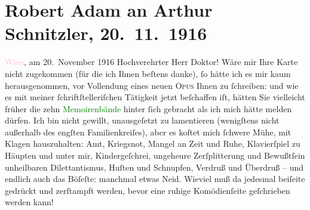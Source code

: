 

               \section[Robert Adam an Arthur Schnitzler, 20. 11. 1916]{ Robert Adam an Arthur Schnitzler, 20. 11. 1916}\nopagebreak{}\rehead{ }\normalsize\beginnumbering{} \toendnotes[C]{\smallbreak\pagebreak[2]} 
\toendnotes[C]{\smallbreak}\pstart
           \raggedleft{}{\pb}\textcolor{pink}{Wien}{}\ledrightnote{\textcolor{pink}{Wien}}, am 20. November 1916\pend
           \pstart{}Hochverehrter Herr Doktor!\pend\pstart
           Wäre mir Ihre Karte nicht zugekommen (für die ich Ihnen beſtens danke), ſo hätte ich
               es mir kaum herausgenommen, vor Vollendung eines neuen \textsc{Opus}
               Ihnen zu ſchreiben: und wie es mit meiner ſchriftſtelleriſchen Tätigkeit jetzt
               beſchaffen iſt,  hätten Sie vielleicht früher die
               zehn \textcolor{green}{Memoirenbände}{} hinter ſich
               gebracht als ich mich hätte melden dürfen. Ich bin nicht gewillt, unausgeſetzt zu
               lamentieren (wenigſtens nicht außerhalb des engſten Familienkreiſes), aber es koſtet
               mich ſchwere Mühe, mit Klagen hauszuhalten: Amt, Kriegs{\pb}not, Mangel an Zeit und Ruhe, Klavierſpiel zu Häupten und unter mir,
               Kindergeſchrei, ungeheure Zerſplitterung und Bewußtſein unheilbaren Dilettantismus,
               Huſten und Schnupfen, Verdruß und Überdruß – und endlich auch das Böſeſte: manchmal
               etwas Neid. Wieviel muß da jedesmal beiſeite gedrückt und zerſtampft werden, bevor
               eine ruhige Komödienſeite geſchrieben werden kann!\pend
